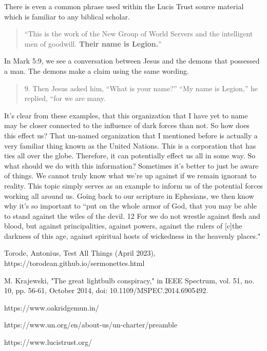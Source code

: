 \documentclass[9.5pt]{article}
\begin{document}
\begin{multicols}{2}
There is even a common phrase used within the Lucis Trust source material which is familiar to any biblical scholar. 

\begin{quotation}
``This is the work of the New Group of World Servers and the intelligent men of goodwill. \textbf{Their name is Legion.}” \cite{LTAboutUs}
\end{quotation}

In Mark 5:9, we see a conversation between Jesus and the demons that possessed a man. The demons make a claim using the same wording.

\begin{quotation}
9. Then Jesus asked him, “What is your name?”
“My name is Legion,” he replied, “for we are many.
\end{quotation}

It's clear from these examples, that this organization that I have yet to name may be closer connected to the influence of dark forces than not. So how does this effect us? That un-named organization that I mentioned before is actually a very familiar thing known as the United Nations. This is a corporation that has ties all over the globe. Therefore, it can potentially effect us all in some way. So what should we do with this information? Sometimes it's better to just be aware of things. We cannot truly know what we're up against if we remain ignorant to reality. This topic simply serves as an example to inform us of the potential forces working all around us. Going back to our scripture in Ephesians, we then know why it's so important to ``put on the whole armor of God, that you may be able to stand against the wiles of the devil. 12 For we do not wrestle against flesh and blood, but against principalities, against powers, against the rulers of [c]the darkness of this age, against spiritual hosts of wickedness in the heavenly places."

\begin{thebibliography}{9}
	{\footnotesize
	
	 Torode, Antonius, Test All Things (April 2023), https://torodean.github.io/sermonettes.html
	
	 M. Krajewski, "The great lightbulb conspiracy," in IEEE Spectrum, vol. 51, no. 10, pp. 56-61, October 2014, doi: 10.1109/MSPEC.2014.6905492.
	
	 https://www.oakridgemun.in/
	
	 https://www.un.org/en/about-us/un-charter/preamble
	
	 https://www.lucistrust.org/
	}
\end{thebibliography}

\end{multicols}

\end{document}
